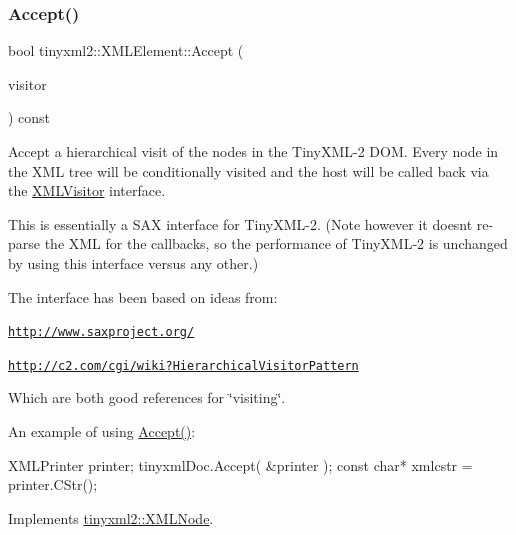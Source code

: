 \subsubsection{\texorpdfstring{Accept()}{Accept()}}
{\footnotesize\ttfamily bool tinyxml2\+::\+X\+M\+L\+Element\+::\+Accept (\begin{DoxyParamCaption}\item[{\hyperlink{classtinyxml2_1_1_x_m_l_visitor}{X\+M\+L\+Visitor} $\ast$}]{visitor }\end{DoxyParamCaption}) const\hspace{0.3cm}{\ttfamily [virtual]}}

Accept a hierarchical visit of the nodes in the Tiny\+X\+M\+L-\/2 D\+OM. Every node in the X\+ML tree will be conditionally visited and the host will be called back via the \hyperlink{classtinyxml2_1_1_x_m_l_visitor}{X\+M\+L\+Visitor} interface.

This is essentially a S\+AX interface for Tiny\+X\+M\+L-\/2. (Note however it doesn\textquotesingle{}t re-\/parse the X\+ML for the callbacks, so the performance of Tiny\+X\+M\+L-\/2 is unchanged by using this interface versus any other.)

The interface has been based on ideas from\+:


\begin{DoxyItemize}
\item \href{http://www.saxproject.org/}{\tt http\+://www.\+saxproject.\+org/}
\item \href{http://c2.com/cgi/wiki?HierarchicalVisitorPattern}{\tt http\+://c2.\+com/cgi/wiki?\+Hierarchical\+Visitor\+Pattern}
\end{DoxyItemize}

Which are both good references for \char`\"{}visiting\char`\"{}.

An example of using \hyperlink{classtinyxml2_1_1_x_m_l_element_a9b2119831e8b85827d5d3e5076788e4a}{Accept()}\+: \begin{DoxyVerb}XMLPrinter printer;
tinyxmlDoc.Accept( &printer );
const char* xmlcstr = printer.CStr();
\end{DoxyVerb}
 

Implements \hyperlink{classtinyxml2_1_1_x_m_l_node_a81e66df0a44c67a7af17f3b77a152785}{tinyxml2\+::\+X\+M\+L\+Node}.

\mbox{\label{classtinyxml2_1_1_x_m_l_element_a48cf4a315cfbac7d74cd0d5ff2c5df51}} 

